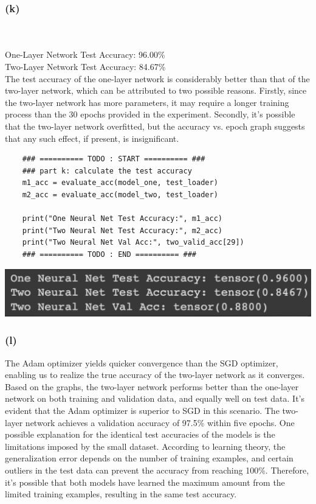 \documentclass[11pt]{article}
\newcommand{\sol}[1]{{\bf{\color{magenta}{{Solution:}}}}}
\begin{document}
 \subsubsection*{(k)}
\sol x \\
\\
One-Layer Network Test Accuracy: 96.00\% \\
Two-Layer Network Test Accuracy: 84.67\% \\

The test accuracy of the one-layer network is considerably better than that of the two-layer network, which can be attributed to two possible reasons. Firstly, since the two-layer network has more parameters, it may require a longer training process than the 30 epochs provided in the experiment. Secondly, it's possible that the two-layer network overfitted, but the accuracy vs. epoch graph suggests that any such effect, if present, is insignificant. \\

\begin{lstlisting}
    ### ========== TODO : START ========== ###
    ### part k: calculate the test accuracy
    m1_acc = evaluate_acc(model_one, test_loader)
    m2_acc = evaluate_acc(model_two, test_loader)
    
    print("One Neural Net Test Accuracy:", m1_acc)
    print("Two Neural Net Test Accuracy:", m2_acc)
    print("Two Neural Net Val Acc:", two_valid_acc[29])
    ### ========== TODO : END ========== ###
\end{lstlisting}

\begin{center}
    \includegraphics[scale=0.3]{4k.png} \\
\end{center}

\subsubsection*{(l)}
\sol x The Adam optimizer yields quicker convergence than the SGD optimizer, enabling us to realize the true accuracy of the two-layer network as it converges. Based on the graphs, the two-layer network performs better than the one-layer network on both training and validation data, and equally well on test data. It's evident that the Adam optimizer is superior to SGD in this scenario. The two-layer network achieves a validation accuracy of 97.5\% within five epochs. One possible explanation for the identical test accuracies of the models is the limitations imposed by the small dataset. According to learning theory, the generalization error depends on the number of training examples, and certain outliers in the test data can prevent the accuracy from reaching 100\%. Therefore, it's possible that both models have learned the maximum amount from the limited training examples, resulting in the same test accuracy. \\
\end{document}
